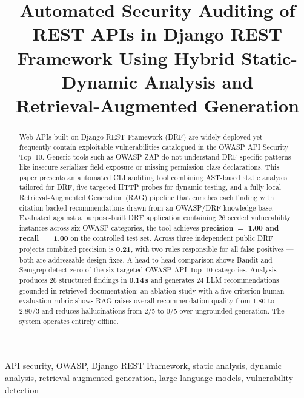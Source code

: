 \documentclass[conference]{IEEEtran}
\begin{document}
\title{Automated Security Auditing of REST APIs in Django REST Framework
Using Hybrid Static-Dynamic Analysis and\\Retrieval-Augmented Generation}

\author{
  \and
}

\maketitle

\begin{abstract}
Web APIs built on Django REST Framework (DRF) are widely deployed yet frequently
contain exploitable vulnerabilities catalogued in the OWASP API Security Top~10.
Generic tools such as OWASP ZAP do not understand DRF-specific patterns like
insecure serializer field exposure or missing permission class declarations.
This paper presents an automated CLI auditing tool combining AST-based static
analysis tailored for DRF, five targeted HTTP probes for dynamic testing, and a
fully local Retrieval-Augmented Generation (RAG) pipeline that enriches each
finding with citation-backed recommendations drawn from an OWASP/DRF knowledge
base. Evaluated against a purpose-built DRF application containing 26 seeded
vulnerability instances across six OWASP categories, the tool achieves
\textbf{precision~=~1.00 and recall~=~1.00} on the controlled test set.
Across three independent public DRF projects combined precision is
\textbf{0.21}, with two rules responsible for all false positives — both
are addressable design fixes. A head-to-head comparison shows Bandit and
Semgrep detect zero of the six targeted OWASP API Top~10 categories.
Analysis produces 26 structured findings in \textbf{0.14\,s} and generates
24 LLM recommendations grounded in retrieved documentation; an ablation
study with a five-criterion human-evaluation rubric shows RAG raises
overall recommendation quality from 1.80 to 2.80/3 and reduces
hallucinations from 2/5 to 0/5 over ungrounded generation.
The system operates entirely offline.
\end{abstract}

\begin{IEEEkeywords}
API security, OWASP, Django REST Framework, static analysis, dynamic analysis,
retrieval-augmented generation, large language models, vulnerability detection
\end{IEEEkeywords}
\end{document}
